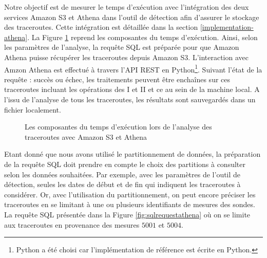  Notre objectif est de mesurer le temps d'exécution avec  l'intégration des deux services  Amazon S3 et Athena dans l'outil de détection afin d'assurer le stockage des traceroutes. Cette intégration est détaillée dans la section \ref{implementation-athena}. 
La Figure 	\ref{fig:amazonathena} reprend les composantes du temps d'exécution. 
Ainsi, selon les paramètres de l'analyse, la requête SQL  est préparée pour que Amazon Athena puisse récupérer les traceroutes depuis Amazon S3. L'interaction avec Amzon Athena est effectué à travers l'API REST en Python\footnote{Python a été choisi car l'implémentation de référence est écrite en Python.}. Suivant l'état de la requête : succès ou échec, les traitements peuvent être enchaînes sur ces traceroutes incluant les opérations des I et II et ce au sein de la machine local. A l'issu de l'analyse de tous les traceroutes, les résultats sont sauvegardés dans un fichier localement.


\begin{figure}[h]
	\centering
	\captionsetup{justification=centering}
	\resizebox{\textwidth}{!}{
		
	}
	\caption{Les composantes du temps d'exécution lors de l'analyse des traceroutes avec Amazon S3 et Athena }
	\label{fig:amazonathena}
\end{figure}






Etant donné que nous avons utilisé le partitionnement de données, la préparation de la requête SQL 
doit prendre en compte le choix des partitions à consulter selon les données souhaitées.
Par exemple, avec les paramètres de l'outil de détection, seules les dates de début et de fin qui indiquent les traceroutes à considérer. Or, avec l'utilisation du partitionnement, on peut encore  préciser les traceroutes en se limitant à une ou plusieurs identifiants de mesures des sondes. 
La requête SQL présentée dans la Figure 	\ref{fig:sqlrequestathena}  où on se limite aux traceroutes en provenance des mesures $ 5001 $ et $ 5004 $.
 
